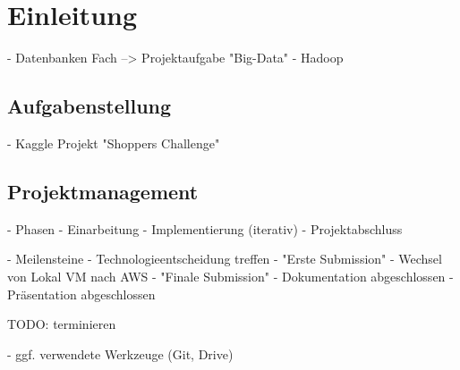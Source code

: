 \section{Einleitung}
- Datenbanken Fach --> Projektaufgabe "Big-Data"
- Hadoop


\subsection{Aufgabenstellung}
- Kaggle Projekt "Shoppers Challenge"

\subsection{Projektmanagement}
- Phasen
	- Einarbeitung
	- Implementierung (iterativ)
	- Projektabschluss
	
- Meilensteine
	- Technologieentscheidung treffen
	- "Erste Submission"
	- Wechsel von Lokal VM nach AWS
	- "Finale Submission" 
	- Dokumentation abgeschlossen
	- Präsentation abgeschlossen
	
	TODO: terminieren
	
- ggf. verwendete Werkzeuge (Git, Drive)





